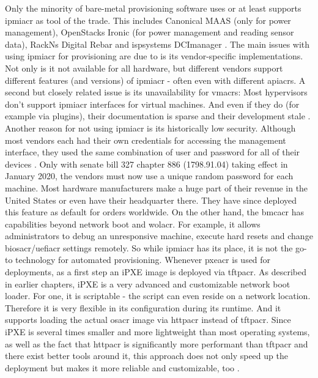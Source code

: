 \newline
Only the minority of bare-metal provisioning software uses or at least supports \gls{ipmiacr} as tool of the trade. This includes Canonical MAAS (only for power management), OpenStacks Ironic (for power management and reading sensor data), RackNs Digital Rebar and ispsystems DCImanager \cite{maas_snap_power_management} \cite{openstack_ironic_docs} \cite{rackn_what_is_digital_rebar} \cite{ispsystem_dcimanager}.
The main issues with using \gls{ipmiacr} for provisioning are due to is its vendor-specific implementations. Not only is it not available for all hardware, but different vendors support different features (and versions) of \gls{ipmiacr} - often even with different \gls{apiacr}s. A second but closely related issue is its unavailability for \gls{vmacr}s: Most hypervisors don't support \gls{ipmiacr} interfaces for virtual machines. And even if they do (for example via plugins), their documentation is sparse and their development stale \cite{openstack_virtualbmc}.
\newline
Another reason for not using \gls{ipmiacr} is its historically low security. Although most vendors each had their own credentials for accessing the management interface, they used the same combination of user and password for all of their devices \cite{bmc_default_passwords}. Only with senate bill 327 chapter 886 (1798.91.04) taking effect in January 2020, the vendors must now use a unique random password for each machine. Most hardware manufacturers make a huge part of their revenue in the United States or even have their headquarter there. They have since deployed this feature as default for orders worldwide.
\newline
On the other hand, the \gls{bmcacr} has capabilities beyond network boot and \gls{wolacr}. For example, it allows administrators to debug an unresponsive machine, execute hard resets and change \gls{biosacr}/\gls{uefiacr} settings remotely.
So while \gls{ipmiacr} has its place, it is not the go-to technology for automated provisioning.
\newline
Whenever \gls{pxeacr} is used for deployments, as a first step an iPXE image is deployed via \gls{tftpacr}. As described in earlier chapters, iPXE is a very advanced and customizable network boot loader. For one, it is scriptable \cite{ipxe_scripting} - the script can even reside on a network location. Therefore it is very flexible in its configuration during its runtime. And it supports loading the actual \gls{osacr} image via \gls{httpacr} instead of \gls{tftpacr}. Since iPXE is several times smaller and more lightweight than most operating systems, as well as the fact that \gls{httpacr} is significantly more performant than \gls{tftpacr} and there exist better tools around it, this approach does not only speed up the deployment but makes it more reliable and customizable, too \cite{ipxe_uefi_http} \cite{why_ipxe} \cite{foreman_ipxe} \cite{jpmens_network_boot_http}.
